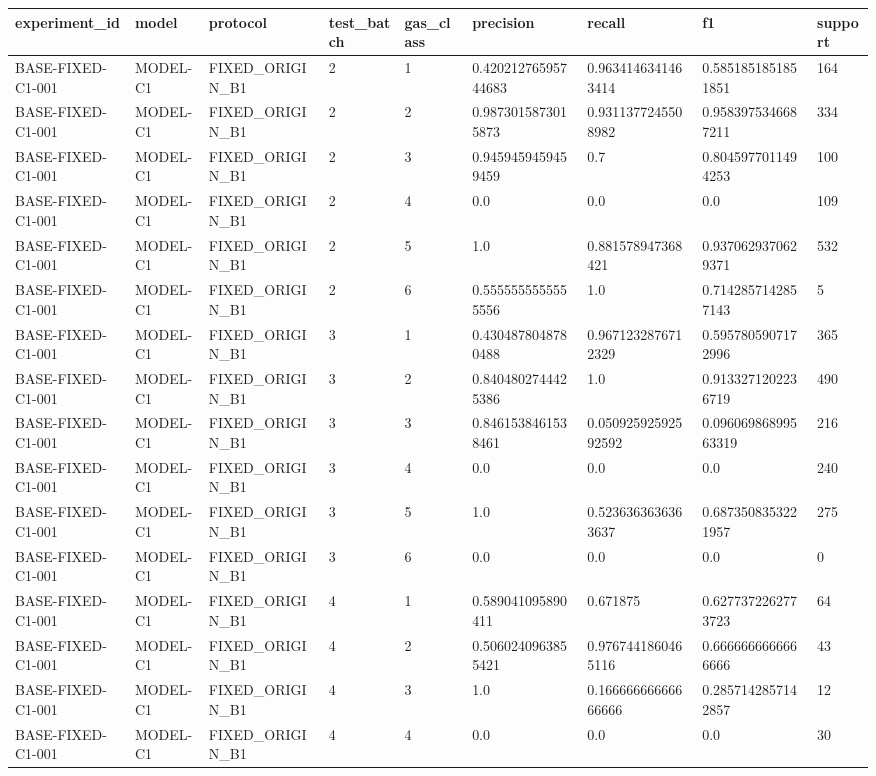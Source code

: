 \begin{tabular}{lllllllll}
 \hline
experiment\_id & model & protocol & test\_batch & gas\_class & precision & recall & f1 & support \\
 \hline
BASE-FIXED-C1-001 & MODEL-C1 & FIXED\_ORIGIN\_B1 & 2 & 1 & 0.42021276595744683 & 0.9634146341463414 & 0.5851851851851851 & 164 \\
BASE-FIXED-C1-001 & MODEL-C1 & FIXED\_ORIGIN\_B1 & 2 & 2 & 0.9873015873015873 & 0.9311377245508982 & 0.9583975346687211 & 334 \\
BASE-FIXED-C1-001 & MODEL-C1 & FIXED\_ORIGIN\_B1 & 2 & 3 & 0.9459459459459459 & 0.7 & 0.8045977011494253 & 100 \\
BASE-FIXED-C1-001 & MODEL-C1 & FIXED\_ORIGIN\_B1 & 2 & 4 & 0.0 & 0.0 & 0.0 & 109 \\
BASE-FIXED-C1-001 & MODEL-C1 & FIXED\_ORIGIN\_B1 & 2 & 5 & 1.0 & 0.881578947368421 & 0.9370629370629371 & 532 \\
BASE-FIXED-C1-001 & MODEL-C1 & FIXED\_ORIGIN\_B1 & 2 & 6 & 0.5555555555555556 & 1.0 & 0.7142857142857143 & 5 \\
BASE-FIXED-C1-001 & MODEL-C1 & FIXED\_ORIGIN\_B1 & 3 & 1 & 0.4304878048780488 & 0.9671232876712329 & 0.5957805907172996 & 365 \\
BASE-FIXED-C1-001 & MODEL-C1 & FIXED\_ORIGIN\_B1 & 3 & 2 & 0.8404802744425386 & 1.0 & 0.9133271202236719 & 490 \\
BASE-FIXED-C1-001 & MODEL-C1 & FIXED\_ORIGIN\_B1 & 3 & 3 & 0.8461538461538461 & 0.05092592592592592 & 0.09606986899563319 & 216 \\
BASE-FIXED-C1-001 & MODEL-C1 & FIXED\_ORIGIN\_B1 & 3 & 4 & 0.0 & 0.0 & 0.0 & 240 \\
BASE-FIXED-C1-001 & MODEL-C1 & FIXED\_ORIGIN\_B1 & 3 & 5 & 1.0 & 0.5236363636363637 & 0.6873508353221957 & 275 \\
BASE-FIXED-C1-001 & MODEL-C1 & FIXED\_ORIGIN\_B1 & 3 & 6 & 0.0 & 0.0 & 0.0 & 0 \\
BASE-FIXED-C1-001 & MODEL-C1 & FIXED\_ORIGIN\_B1 & 4 & 1 & 0.589041095890411 & 0.671875 & 0.6277372262773723 & 64 \\
BASE-FIXED-C1-001 & MODEL-C1 & FIXED\_ORIGIN\_B1 & 4 & 2 & 0.5060240963855421 & 0.9767441860465116 & 0.6666666666666666 & 43 \\
BASE-FIXED-C1-001 & MODEL-C1 & FIXED\_ORIGIN\_B1 & 4 & 3 & 1.0 & 0.16666666666666666 & 0.2857142857142857 & 12 \\
BASE-FIXED-C1-001 & MODEL-C1 & FIXED\_ORIGIN\_B1 & 4 & 4 & 0.0 & 0.0 & 0.0 & 30 \\

\end{tabular}
